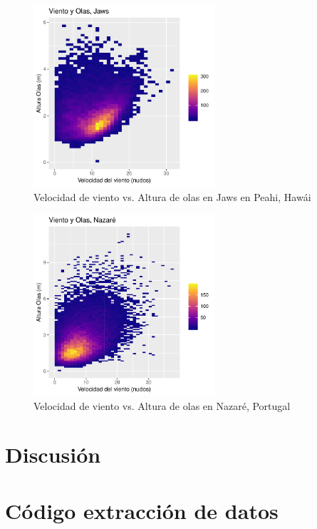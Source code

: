 \begin{figure}[!ht]
\label{fig:wind_waves_jaws}
\centering
\includegraphics[width=0.6\textwidth]{./figures/jaws_bin2d.pdf}
  \caption{Velocidad de viento vs. Altura de olas en Jaws en Peahi, Hawái}
\end{figure}

\begin{figure}[!ht]
\label{fig:wind_waves_nazare}
\centering
\includegraphics[width=0.6\textwidth]{./figures/nazare_bin2d.pdf}
  \caption{Velocidad de viento vs. Altura de olas en Nazaré, Portugal}
\end{figure}



\section{Discusión}%
\label{sec:discusión}


\pagebreak
\appendix

\section{Código extracción de datos}%
\label{sec:codigo_extraccion_de_datos}






